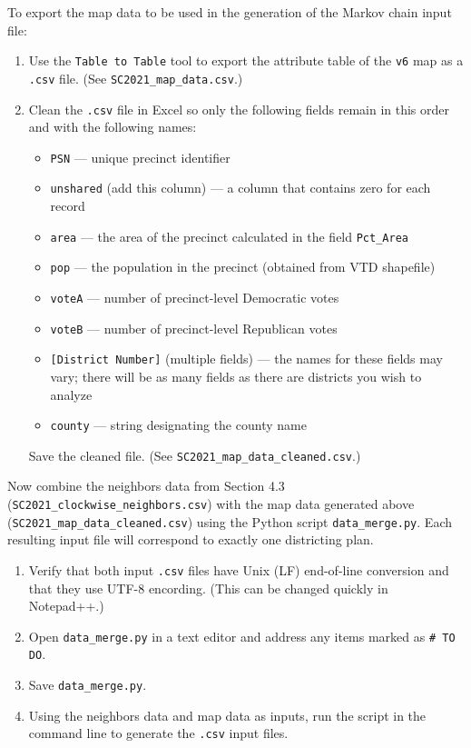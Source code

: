 \documentclass[11pt]{article}
\begin{document}
To export the map data to be used in the generation of the Markov chain input file:
\begin{enumerate}
	\item Use the \verb|Table to Table| tool to export the attribute table of the \verb|v6| map as a \verb|.csv| file. (See \verb|SC2021_map_data.csv|.)
	\item Clean the \verb|.csv| file in Excel so only the following fields remain in this order and with the following names:
	\begin{itemize}
		\item \verb|PSN| --- unique precinct identifier
		\item \verb|unshared| (add this column) --- a column that contains zero for each record
		\item \verb|area| --- the area of the precinct calculated in the field \verb|Pct_Area|
		\item \verb|pop| --- the population in the precinct (obtained from VTD shapefile)
		\item \verb|voteA| --- number of precinct-level Democratic votes
		\item \verb|voteB| --- number of precinct-level Republican votes
		\item \verb|[District Number]| (multiple fields) --- the names for these fields may vary; there will be as many fields as there are districts you wish to analyze
		\item \verb|county| --- string designating the county name
	\end{itemize}
	Save the cleaned file. (See \verb|SC2021_map_data_cleaned.csv|.)\\
\end{enumerate}

Now combine the neighbors data from Section 4.3 (\verb|SC2021_clockwise_neighbors.csv|) with the map data generated above (\verb|SC2021_map_data_cleaned.csv|) using the Python script \verb|data_merge.py|. Each resulting input file will correspond to exactly one districting plan.
\begin{enumerate}
	\item Verify that both input \verb|.csv| files have Unix (LF) end-of-line conversion and that they use UTF-8 encording. (This can be changed quickly in Notepad++.)
	\item Open \verb|data_merge.py| in a text editor and address any items marked as \verb|# TO DO|.
	\item Save \verb|data_merge.py|.
	\item Using the neighbors data and map data as inputs, run the script in the command line to generate the \verb|.csv| input files.\\
\end{enumerate}
\end{document}
